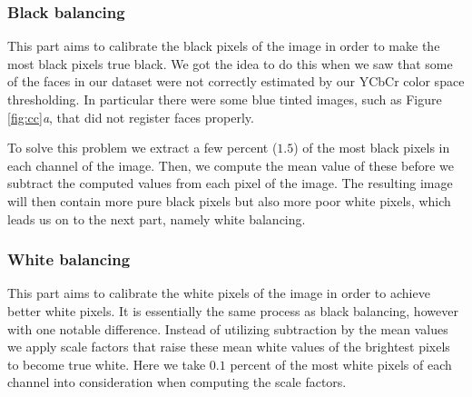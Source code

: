 \subsubsection{Black balancing}
This part aims to calibrate the black pixels of the image in order to make the most black pixels true black. We got the idea to do this when we saw that some of the faces in our dataset were not correctly estimated by our YCbCr color space thresholding. In particular there were some blue tinted images, such as Figure \ref{fig:cc}\textit{a}, that did not register faces properly. 

To solve this problem we extract a few percent ($1.5$) of the most black pixels in each channel of the image. Then, we compute the mean value of these before we subtract the computed values from each pixel of the image. The resulting image will then contain more pure black pixels but also more poor white pixels, which leads us on to the next part, namely white balancing.


\subsubsection{White balancing}
This part aims to calibrate the white pixels of the image in order to achieve better white pixels. It is essentially the same process as black balancing, however with one notable difference. Instead of utilizing subtraction by the mean values we apply scale factors that raise these mean white values of the brightest pixels to become true white. Here we take $0.1$ percent of the most white pixels of each channel into consideration when computing the scale factors.
